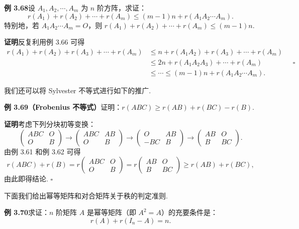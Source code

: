 \documentclass[UTF8,12pt,a4paper,fontset=fandol]{ctexart}
\begin{document}
\noindent\textbf{例 3.68}\quad 设 $A_1,A_2,\cdots,A_m$ 为 $n$ 阶方阵，求证：
\[
r(A_1)+r(A_2)+\cdots+r(A_m)\le (m-1)n+r(A_1A_2\cdots A_m).
\]
特别地，若 $A_1A_2\cdots A_m=O$，则 $r(A_1)+r(A_2)+\cdots+r(A_m)\le (m-1)n$.

\noindent\textbf{证明}\quad 反复利用例 3.66 可得
\[
\begin{aligned}
r(A_1)+r(A_2)+r(A_3)+\cdots+r(A_m)
&\le n+r(A_1A_2)+r(A_3)+\cdots+r(A_m)\\
&\le 2n+r(A_1A_2A_3)+\cdots+r(A_m)\\
&\le\cdots\le (m-1)n+r(A_1A_2\cdots A_m).
\end{aligned}
\quad \square
\]

我们还可以将 Sylvester 不等式进行如下的推广.

\noindent\textbf{例 3.69（Frobenius 不等式）}\quad 证明：$r(ABC)\ge r(AB)+r(BC)-r(B)$.

\noindent\textbf{证明}\quad 考虑下列分块初等变换：
\[
\begin{pmatrix}ABC&O\\O&B\end{pmatrix}
\to
\begin{pmatrix}ABC&AB\\O&B\end{pmatrix}
\to
\begin{pmatrix}O&AB\\-BC&B\end{pmatrix}
\to
\begin{pmatrix}AB&O\\B&BC\end{pmatrix}.
\]
由例 3.61 和例 3.62 可得
\[
r(ABC)+r(B)=r\begin{pmatrix}ABC&O\\O&B\end{pmatrix}
=r\begin{pmatrix}AB&O\\B&BC\end{pmatrix}\ge r(AB)+r(BC),
\]
由此即得结论. $\square$

下面我们给出幂等矩阵和对合矩阵关于秩的判定准则.

\noindent\textbf{例 3.70}\quad 求证：$n$ 阶矩阵 $A$ 是幂等矩阵（即 $A^2=A$）的充要条件是：
\[
r(A)+r(I_n-A)=n.
\]
\end{document}
